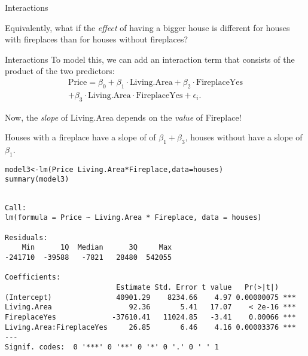 \documentclass{beamer}\usepackage[]{graphicx}\usepackage[]{color}
\makeatletter
\newcommand{\hlopt}[1]{\textcolor[rgb]{1,0.894,0.769}{#1}}%
\newcommand{\hlstd}[1]{\textcolor[rgb]{1,0.894,0.769}{#1}}%
\newcommand{\hlkwb}[1]{\textcolor[rgb]{0.804,0.776,0.451}{#1}}%
\newcommand{\hlkwc}[1]{\textcolor[rgb]{0.78,0.941,0.545}{#1}}%
\newcommand{\hlkwd}[1]{\textcolor[rgb]{1,0.78,0.769}{#1}}%
\newenvironment{kframe}{%
 \def\at@end@of@kframe{}%
 \ifinner\ifhmode%
  \def\at@end@of@kframe{\end{minipage}}%
  \begin{minipage}{\columnwidth}%
 \fi\fi%
 \def\FrameCommand##1{\hskip\@totalleftmargin \hskip-\fboxsep
 \colorbox{shadecolor}{##1}\hskip-\fboxsep
     \hskip-\linewidth \hskip-\@totalleftmargin \hskip\columnwidth}%
 \MakeFramed {\advance\hsize-\width
   \@totalleftmargin\z@ \linewidth\hsize
   \@setminipage}}%
 {\par\unskip\endMakeFramed%
 \at@end@of@kframe}
\newenvironment{knitrout}{}{} %
\makeatother
\begin{document}
\begin{darkframes}
\begin{frame}{Interactions}
\begin{center}
        \bigskip\pause

        Equivalently, what if the \emph{effect} of having a bigger house is different for houses with fireplaces than for houses without fireplaces?
      \end{center}
    \end{frame}

    \begin{frame}{Interactions}
      To model this, we can add an \alert{interaction term} that consists of the product of the two predictors:
      \begin{multline*}
        \text{Price} = \beta_0 + \beta_1\cdot\text{Living.Area} + \beta_2\cdot\text{FireplaceYes}
        \\ + \beta_3\cdot\text{Living.Area}\cdot\text{FireplaceYes} + \epsilon_i.
      \end{multline*}

      \pause\bigskip

      Now, the \emph{slope} of Living.Area depends on the \emph{value} of Fireplace!

      \bigskip
      Houses with a fireplace have a slope of of $\beta_1+\beta_3$, houses without have a slope of $\beta_1$.
    \end{frame}

    \begin{frame}[fragile]
      \fontsize{8}{8}\selectfont
\begin{knitrout}
\begin{kframe}
\begin{alltt}
\hlstd{model3} \hlkwb{<-} \hlkwd{lm}\hlstd{(Price} \hlopt{~} \hlstd{Living.Area} \hlopt{*} \hlstd{Fireplace,} \hlkwc{data}\hlstd{=houses)}
\hlkwd{summary}\hlstd{(model3)}
\end{alltt}
\begin{verbatim}

Call:
lm(formula = Price ~ Living.Area * Fireplace, data = houses)

Residuals:
    Min      1Q  Median      3Q     Max 
-241710  -39588   -7821   28480  542055 

Coefficients:
                          Estimate Std. Error t value   Pr(>|t|)    
(Intercept)               40901.29    8234.66    4.97 0.00000075 ***
Living.Area                  92.36       5.41   17.07    < 2e-16 ***
FireplaceYes             -37610.41   11024.85   -3.41    0.00066 ***
Living.Area:FireplaceYes     26.85       6.46    4.16 0.00003376 ***
---
Signif. codes:  0 '***' 0 '**' 0 '*' 0 '.' 0 ' ' 1


\end{verbatim}
\end{kframe}
\end{knitrout}
\end{frame}
\end{darkframes}
\end{document}
